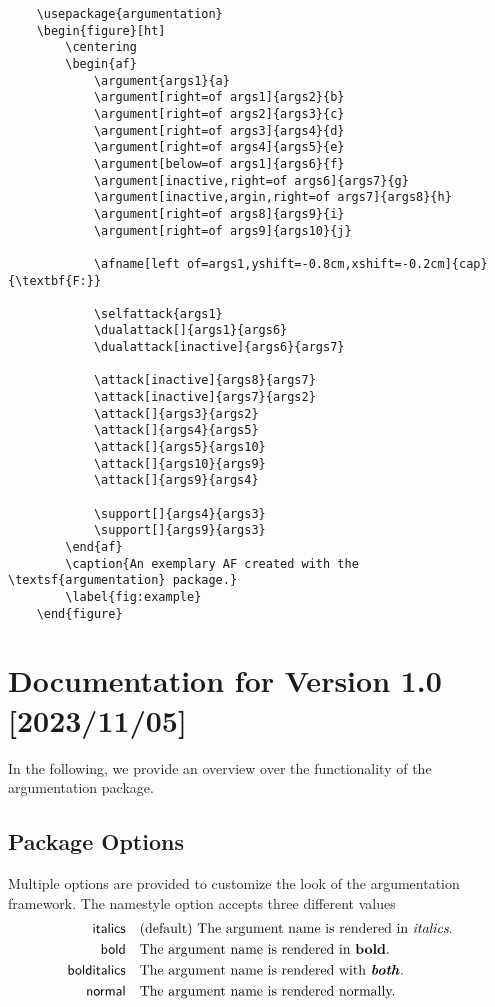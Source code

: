 \documentclass{article}
\begin{document}
\begin{verbatim}
    \usepackage{argumentation}
    \begin{figure}[ht]
        \centering
        \begin{af}
            \argument{args1}{a}
            \argument[right=of args1]{args2}{b}
            \argument[right=of args2]{args3}{c}
            \argument[right=of args3]{args4}{d}
            \argument[right=of args4]{args5}{e}
            \argument[below=of args1]{args6}{f}
            \argument[inactive,right=of args6]{args7}{g}
            \argument[inactive,argin,right=of args7]{args8}{h}
            \argument[right=of args8]{args9}{i}
            \argument[right=of args9]{args10}{j}
    
            \afname[left of=args1,yshift=-0.8cm,xshift=-0.2cm]{cap}{\textbf{F:}}
    
            \selfattack{args1}
            \dualattack[]{args1}{args6}
            \dualattack[inactive]{args6}{args7}
            
            \attack[inactive]{args8}{args7}
            \attack[inactive]{args7}{args2}
            \attack[]{args3}{args2}    
            \attack[]{args4}{args5}
            \attack[]{args5}{args10}
            \attack[]{args10}{args9}
            \attack[]{args9}{args4}

            \support[]{args4}{args3}
            \support[]{args9}{args3}
        \end{af}
        \caption{An exemplary AF created with the \textsf{argumentation} package.}
        \label{fig:example}
    \end{figure}
\end{verbatim}

\section{Documentation for Version 1.0 [2023/11/05]}
In the following, we provide an overview over the functionality of the \textsf{argumentation} package.

\subsection{Package Options}
    Multiple options are provided to customize the look of the argumentation framework.
    The \textsf{namestyle} option accepts three different values
    \begin{align*}
        \mathsf{italics} &\quad \text{(default) The argument name is rendered in \emph{italics}.}\\
        \mathsf{bold} &\quad \text{The argument name is rendered in \textbf{bold}.}\\
        \mathsf{bolditalics} &\quad \text{The argument name is rendered with \textbf{\emph{both}}.}\\
        \mathsf{normal} &\quad \text{The argument name is rendered normally.}
    \end{align*}
\end{document}
